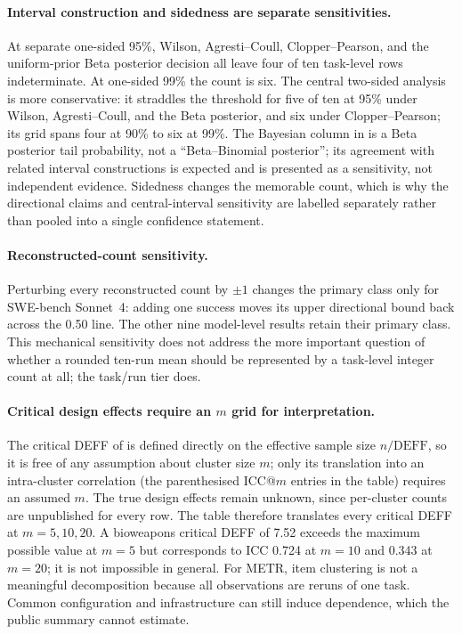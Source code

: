 \documentclass{article}
\begin{document}
\paragraph{Interval construction and sidedness are separate sensitivities.}
At separate one-sided 95\%, Wilson, Agresti--Coull, Clopper--Pearson, and the
uniform-prior Beta posterior decision all leave four of ten task-level rows indeterminate.
At one-sided 99\% the count is six. The central two-sided analysis is more conservative:
it straddles the threshold for five of ten at
95\% under Wilson, Agresti--Coull, and the Beta posterior, and six under
Clopper--Pearson; its grid spans four at 90\% to six at 99\%. The Bayesian column in
 is a Beta posterior tail probability, not a ``Beta--Binomial posterior'';
its agreement with related interval constructions is expected and is presented as a
sensitivity, not independent evidence. Sidedness changes the memorable count, which is why
the directional claims and central-interval sensitivity are labelled separately rather than
pooled into a single confidence statement.

\paragraph{Reconstructed-count sensitivity.}
Perturbing every reconstructed count by $\pm1$ changes the primary class only for
SWE-bench Sonnet~4: adding one success moves its upper directional bound back across the
0.50 line. The other nine model-level results retain their primary class. This mechanical
sensitivity does not address the more important question of whether a rounded ten-run mean
should be represented by a task-level integer count at all; the task/run tier does.

\paragraph{Critical design effects require an $m$ grid for interpretation.}
The critical DEFF of  is defined directly on the effective sample size
$n/\mathrm{DEFF}$, so it is free of any assumption about cluster size $m$; only its
translation into an intra-cluster correlation (the parenthesised ICC@$m$ entries in the
table) requires an assumed $m$. The true design effects remain unknown, since per-cluster
counts are unpublished for every row. The table therefore translates every critical DEFF
at $m=5,10,20$. A bioweapons critical DEFF of 7.52 exceeds the maximum possible value at
$m=5$ but corresponds to ICC 0.724 at $m=10$ and 0.343 at $m=20$; it is not impossible in
general. For METR, item clustering is not a meaningful decomposition because all observations
are reruns of one task. Common configuration and infrastructure can still induce dependence,
which the public summary cannot estimate.
\end{document}
